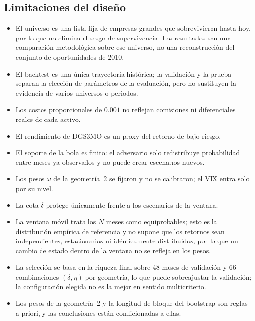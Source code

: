 \subsection{Limitaciones del diseño}\label{sec:limit}

\begin{itemize}
    \item El universo es una lista fija de empresas grandes que sobrevivieron hasta hoy, por lo que no elimina el sesgo de supervivencia. Los resultados son una comparación metodológica sobre ese universo, no una reconstrucción del conjunto de oportunidades de 2010.
    \item El backtest es una única trayectoria histórica; la validación y la prueba separan la elección de parámetros de la evaluación, pero no sustituyen la evidencia de varios universos o periodos.
    \item Los costos proporcionales de $0.001$ no reflejan comisiones ni diferenciales reales de cada activo.
    \item El rendimiento de DGS3MO es un proxy del retorno de bajo riesgo.
    \item El soporte de la bola es finito: el adversario solo redistribuye probabilidad entre meses ya observados y no puede crear escenarios nuevos.
    \item Los pesos $\omega$ de la geometría~2 se fijaron y no se calibraron; el VIX entra solo por su nivel.
    
\item La cota $\delta$ protege únicamente frente a los escenarios de la ventana.
    \item La ventana móvil trata los $N$ meses como equiprobables; esto es la distribución empírica de referencia y no supone que los retornos sean independientes, estacionarios ni idénticamente distribuidos, por lo que un cambio de estado dentro de la ventana no se refleja en los pesos.
    \item La selección se basa en la riqueza final sobre 48 meses de validación y 66 combinaciones $(\delta,\eta)$ por geometría, lo que puede sobreajustar la validación; la configuración elegida no es la mejor en sentido multicriterio.
    \item Los pesos de la geometría~2 y la longitud de bloque del bootstrap son reglas a priori, y las conclusiones están condicionadas a ellas.
\end{itemize}

